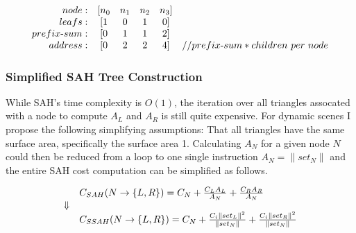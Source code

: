 \begin{displaymath}
  \begin{array}{r c c c c l}
    node: & [n_0 & n_1 & n_2 & n_3]\\
    leafs: & [1 & 0 & 1 & 0]\\
    prefix\text{-}sum: & [0 & 1 & 1 & 2]\\
    address: & [0 & 2 & 2 & 4] & // prefix\text{-}sum * children\text{ }per\text{ } node\\
  \end{array}
\end{displaymath}



\subsubsection{Simplified SAH Tree Construction}


While SAH's time complexity is $O(1)$, the iteration over all triangles
assocated with a node to compute $A_L$ and $A_R$ is still quite expensive. For
dynamic scenes I propose the following simplifying assumptions: That all
triangles have the same surface area, specifically the surface area
1. Calculating $A_N$ for a given node $N$ could then be reduced from a loop to
one single instruction $A_N = \|set_N\|$ and the entire SAH cost computation can
be simplified as follows.

\begin{displaymath}
  \begin{array}{r l}
    & C_{SAH}(N \rightarrow \{L, R\}) = C_N + \frac{C_L A_L}{A_N} + \frac{C_R
      A_R}{A_N}\\
    \Downarrow \\
    & C_{SSAH}(N \rightarrow \{L, R\}) = C_N +
    \frac{C_i \|set_L\|^2}{\|set_N\|} + \frac{C_i \|set_R\|^2}{\|set_N\|}\\
  \end{array}
\end{displaymath}


